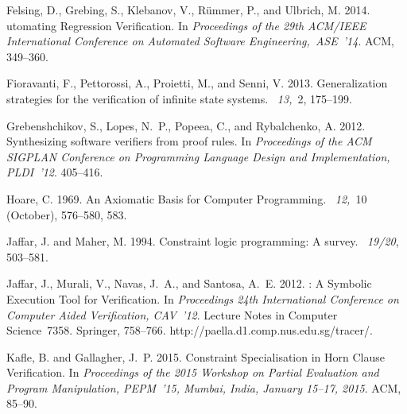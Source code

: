 \documentclass[english]{tlp}
\begin{document}
\begin{thebibliography}{}
{\sc Felsing, D.}, {\sc Grebing, S.}, {\sc Klebanov, V.}, {\sc R\"{u}mmer, P.}, {\sc and}
  {\sc Ulbrich, M.} 2014.
utomating {R}egression {V}erification.
\newblock In {\em Proceedings of the 29th {ACM/IEEE} {I}nternational {C}onference on  {A}utomated {S}oftware {E}ngineering,~ASE~'14}. {ACM}, 349--360.

{\sc Fioravanti, F.}, {\sc Pettorossi, A.}, {\sc Proietti, M.}, {\sc and} {\sc
  Senni, V.} 2013.
\newblock Generalization strategies for the verification of infinite state
  systems.
~{\em 13,\/}~2, 175--199.

{\sc Grebenshchikov, S.}, {\sc Lopes, N.~P.}, {\sc Popeea, C.}, {\sc and} {\sc
  Rybalchenko, A.} 2012.
\newblock Synthesizing software verifiers from proof rules.
\newblock In {\em Proceedings of the ACM SIGPLAN Conference on Programming
  Language Design and Implementation, PLDI~'12}. 405--416.

{\sc Hoare, C.} 1969.
\newblock An {A}xiomatic {B}asis for {C}omputer {P}rogramming.
~{\em 12,\/}~10 (October), 576--580, 583.

{\sc Jaffar, J.} {\sc and} {\sc Maher, M.} 1994.
\newblock Constraint logic programming: {A} survey.
~{\em 19/20}, 503--581.

{\sc Jaffar, J.}, {\sc Murali, V.}, {\sc Navas, J.~A.}, {\sc and} {\sc Santosa,
  A.~E.} 2012.
: {A} {S}ymbolic {E}xecution {T}ool for {V}erification.
\newblock In {\em {P}roceedings 24th {I}nternational {C}onference on {C}omputer
  {A}ided {V}erification, CAV~'12}. Lecture Notes in Computer Science~7358.
  Springer, 758--766.
\newblock \rm {http://paella.d1.comp.nus.edu.sg/tracer/}.

{\sc Kafle, B.} {\sc and} {\sc Gallagher, J.~P.} 2015.
\newblock Constraint {S}pecialisation in {H}orn {C}lause {V}erification.
\newblock In {\em Proceedings of the 2015 Workshop on Partial Evaluation and
  Program Manipulation, PEPM~'15, Mumbai, India, January 15--17, 2015}. {ACM},
  85--90.


\end{thebibliography}
\end{document}

